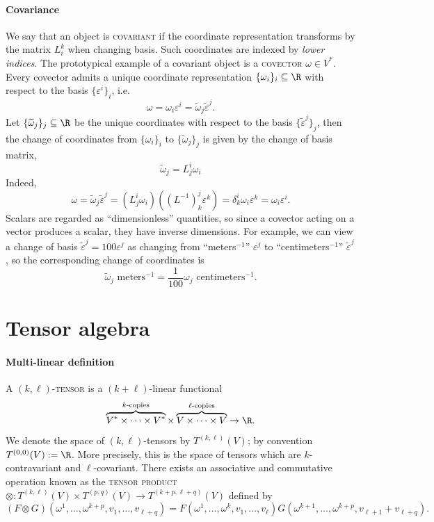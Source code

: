 \documentclass[reqno]{amsart}
\theoremstyle{definition}
\theoremstyle{remark}
\renewcommand{\epsilon}{\varepsilon}
\renewcommand{\emph}{\textsc}
\begin{document}
\paragraph*{\textbf{Covariance}}

We say that an object is \emph{covariant} if the coordinate representation transforms by the matrix $L^k_i$ when changing basis. Such coordinates are indexed by \textit{lower indices}. The prototypical example of a covariant object is a \emph{covector} $\omega \in V^*$. Every covector admits a unique coordinate representation $\{\omega_i \}_i \subseteq \R$ with respect to the basis $\{\epsilon^i\}_i$, i.e.
	\[ \omega = \omega_i \epsilon^i = \widetilde \omega_j \widetilde \epsilon^j. \]
Let $\{\widetilde \omega_j \}_j \subseteq \R$ be the unique coordinates with respect to the basis $\{\widetilde \epsilon^j\}_j$, then the change of coordinates from $\{\omega_i\}_i$ to $\{\widetilde \omega_j\}_j$ is given by the change of basis matrix,
	\[ \widetilde \omega_j = L^i_j \omega_i \]
Indeed, 
	\[ \omega = \widetilde \omega_j \widetilde \epsilon^j = \left( L^i_j \omega_i \right) \left( (L^{-1})_k^j \epsilon^k \right) =  \delta^i_k \omega_i \epsilon^k = \omega_i \epsilon^i. \]
Scalars are regarded as ``dimensionless'' quantities, so since a covector acting on a vector produces a scalar, they have inverse dimensions. For example, we can view a change of basis $\widetilde \epsilon^j = 100 \epsilon^j$ as changing from  ``meters$^{-1}$'' $\epsilon^j$ to ``centimeters$^{-1}$'' $\widetilde \epsilon^j$, so the corresponding change of coordinates is 
	\[ \widetilde \omega_j \text{ meters$^{-1}$} = \frac{1}{100} \omega_j  \text{ centimeters$^{-1}$}. \]


	
	

\section{Tensor algebra}



\paragraph*{\textbf{Multi-linear definition}}

A \emph{$(k, \ell)$-tensor} is a $(k + \ell)$-linear functional
	\[ \overbrace{V^* \times \dots \times V^*}^{\text{$k$-copies}} \times \overbrace{V \times \dots \times V}^{\text{$\ell$-copies}}  \to \R. \]
We denote the space of $(k, \ell)$-tensors by $T^{(k, \ell)} (V)$; by convention $T^{(0, 0)} (V) := \R$. More precisely, this is the space of tensors which are $k$-contravariant and $\ell$-covariant. There exists an associative and commutative operation known as the \emph{tensor product} $\otimes : T^{(k, \ell)}(V) \times T^{(p, q)}(V) \to T^{(k + p, \ell + q)}(V)$ defined by 
	\[ (F \otimes G) (\omega^1, \dots, \omega^{k + p}, v_1, \dots, v_{\ell + q}) = F(\omega^1, \dots, \omega^k, v_1, \dots, v_\ell) G(\omega^{k + 1}, \dots, \omega^{k + p}, v_{\ell + 1} + v_{\ell + q}). \]
\end{document}
